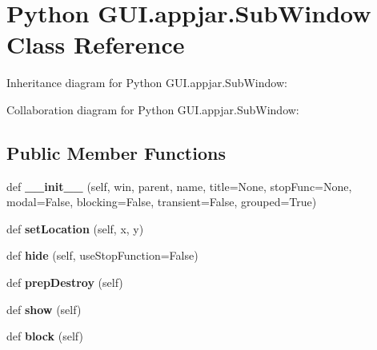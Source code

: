 \hypertarget{class_python_01_g_u_i_1_1appjar_1_1_sub_window}{}\section{Python G\+U\+I.\+appjar.\+Sub\+Window Class Reference}
\label{class_python_01_g_u_i_1_1appjar_1_1_sub_window}


Inheritance diagram for Python G\+U\+I.\+appjar.\+Sub\+Window\+:


Collaboration diagram for Python G\+U\+I.\+appjar.\+Sub\+Window\+:
\subsection*{Public Member Functions}
\begin{DoxyCompactItemize}
\item 
\mbox{\label{class_python_01_g_u_i_1_1appjar_1_1_sub_window_afd09457b826acc4477ba8cfeaae84f45}} 
def {\bfseries \+\_\+\+\_\+init\+\_\+\+\_\+} (self, win, parent, name, title=None, stop\+Func=None, modal=False, blocking=False, transient=False, grouped=True)
\item 
\mbox{\label{class_python_01_g_u_i_1_1appjar_1_1_sub_window_a36d2ac9439b28d81ea9411835d4c0165}} 
def {\bfseries set\+Location} (self, x, y)
\item 
\mbox{\label{class_python_01_g_u_i_1_1appjar_1_1_sub_window_ad925a5a96ac28d88f272d824aa89d46b}} 
def {\bfseries hide} (self, use\+Stop\+Function=False)
\item 
\mbox{\label{class_python_01_g_u_i_1_1appjar_1_1_sub_window_afff2a2a9134390af079410e2c5625315}} 
def {\bfseries prep\+Destroy} (self)
\item 
\mbox{\label{class_python_01_g_u_i_1_1appjar_1_1_sub_window_a2e5deda735f34af0a60478c1cccfaacd}} 
def {\bfseries show} (self)
\item 
\mbox{\label{class_python_01_g_u_i_1_1appjar_1_1_sub_window_a7fc471364591304f6317c093c7d70324}} 
def {\bfseries block} (self)
\end{DoxyCompactItemize}
